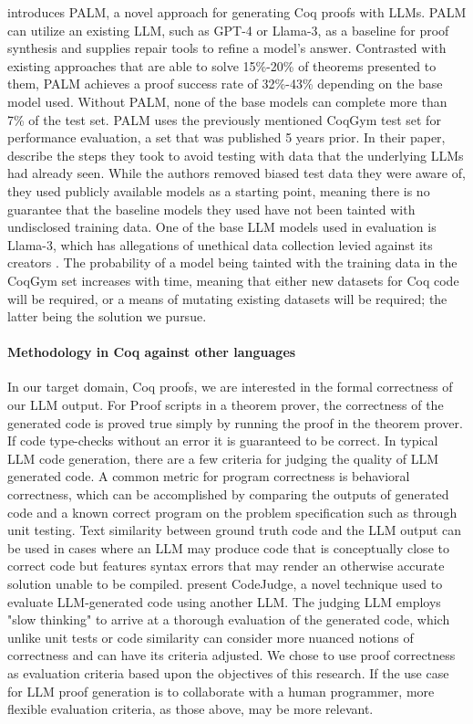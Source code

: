 \citep{proofautomationwithllms} introduces PALM,
a novel approach for generating Coq proofs with LLMs.
PALM can utilize an existing LLM, such as GPT-4 or Llama-3,
as a baseline for proof synthesis and supplies repair tools
to refine a model's answer.
Contrasted with existing approaches that are able
to solve 15\%-20\% of theorems presented to them,
PALM achieves a proof success rate of 32\%-43\% 
depending on the base model used.
Without PALM, none of the base models can
complete more than 7\% of the test set.
PALM uses the previously mentioned CoqGym test set
for performance evaluation, 
a set that was published 5 years prior. 
In their paper, \citeauthor{proofautomationwithllms} describe the steps 
they took to avoid testing with data 
that the underlying LLMs had already seen.  
While the authors removed biased test data they were aware of, 
they used publicly available models as a starting point, 
meaning there is no guarantee that the baseline models 
they used have not been tainted with undisclosed training data. 
One of the base LLM models used in evaluation is Llama-3, 
which has allegations of unethical data collection 
levied against its creators \cite{llama-case}. 
The probability of a model being tainted 
with the training data in the CoqGym set increases with time, 
meaning that either new datasets for Coq code will be required, 
or a means of mutating existing datasets will be required; 
the latter being the solution we pursue.



\paragraph{Methodology in Coq against other languages}
In our target domain, Coq proofs, 
we are interested in the formal correctness of our LLM output.
For Proof scripts in a theorem prover,
the correctness of the generated code is proved true
simply by running the proof in the theorem prover.
If code type-checks without an error it is guaranteed to be correct.
In typical LLM code generation,
there are a few criteria for judging the quality of LLM generated code.  
A common metric for program correctness is behavioral correctness,
which can be accomplished by comparing the outputs of generated code
and a known correct program on the problem specification such as through unit testing.
Text similarity between ground truth code and the LLM output can be used
in cases where an LLM may produce code that is conceptually close
to correct code but features syntax errors that may render an
otherwise accurate solution unable to be compiled.
\citet{CodeJudge} present CodeJudge, a novel technique
used to evaluate LLM-generated code using another LLM.
The judging LLM employs "slow thinking" to arrive at a
thorough evaluation of the generated code,
which unlike unit tests or code similarity can consider
more nuanced notions of correctness and can have its
criteria adjusted.
We chose to use proof correctness as evaluation criteria
based upon the objectives of this research.
If the use case for LLM proof generation is to
collaborate with a human programmer,
more flexible evaluation criteria, as those above, may be more relevant. 

